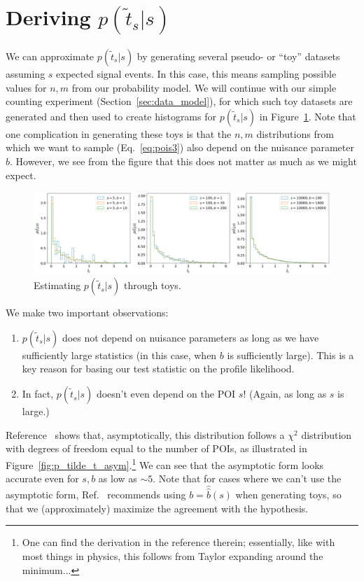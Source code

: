 \section{Deriving \texorpdfstring{$p(\tilde{t}_s|s)$}{p(ts|s)}}

We can approximate $p(\tilde{t}_s|s)$ by generating several pseudo- or ``toy'' datasets assuming $s$ expected signal events.
In this case, this means sampling possible values for $n, m$ from our probability model.
We will continue with our simple counting experiment (Section~\ref{sec:data_model}), for which such toy datasets are generated and then used to create histograms for $p(\tilde{t}_s|s)$ in Figure~\ref{fig:p_tilde_t}.
Note that one complication in generating these toys is that the $n, m$ distributions from which we want to sample (Eq.~\ref{eq:pois3}) also depend on the nuisance parameter $b$.
However, we see from the figure that this does not matter as much as we might expect.

\begin{figure}[htb]
\centering
\includegraphics[width=\textwidth]{figures/02-hypothesis-testing/1.png}
\captionsetup{justification=centering}
\caption{Estimating $p(\tilde{t}_s|s)$ through toys.}
\label{fig:p_tilde_t}
\end{figure}

We make two important observations:
\begin{enumerate}
    \item $p(\tilde{t}_s|s)$ does not depend on nuisance parameters as long as we have sufficiently large statistics (in this case, when $b$ is sufficiently large).
    This is a key reason for basing our test statistic on the profile likelihood.
    \item In fact, $p(\tilde{t}_s|s)$ doesn't even depend on the POI $s$! (Again, as long as $s$ is large.)
\end{enumerate}

Reference~\cite{Cowan:2010js} shows that, asymptotically, this distribution follows a $\chi^2$ distribution with degrees of freedom equal to the number of POIs, as illustrated in Figure~\ref{fig:p_tilde_t_asym}.\footnote{One can find the derivation in the reference therein; essentially, like with most things in physics, this follows from Taylor expanding around the minimum...}
We can see that the asymptotic form looks accurate even for $s, b$ as low as $\sim5$.
Note that for cases where we can't use the asymptotic form, Ref.~\cite{Cranmer:2014lly} recommends using $b = \hat{\hat{b}}(s)$ when generating toys, so that we (approximately) maximize the agreement with the hypothesis.

